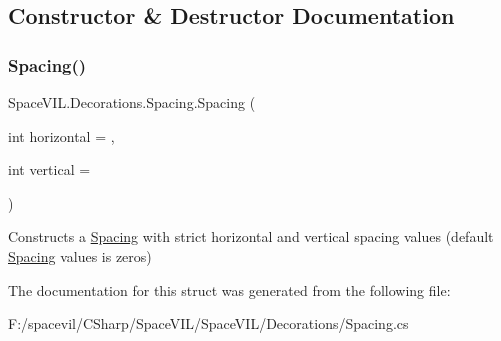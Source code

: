 \subsection{Constructor \& Destructor Documentation}
\mbox{\label{struct_space_v_i_l_1_1_decorations_1_1_spacing_aef752609b39f6b9c34545edff478fbb6}} 
\subsubsection{\texorpdfstring{Spacing()}{Spacing()}}
{\footnotesize\ttfamily Space\+V\+I\+L.\+Decorations.\+Spacing.\+Spacing (\begin{DoxyParamCaption}\item[{int}]{horizontal = {},  }\item[{int}]{vertical = {} }\end{DoxyParamCaption})\hspace{0.3cm}{\ttfamily [inline]}}



Constructs a \mbox{\hyperlink{struct_space_v_i_l_1_1_decorations_1_1_spacing}{Spacing}} with strict horizontal and vertical spacing values (default \mbox{\hyperlink{struct_space_v_i_l_1_1_decorations_1_1_spacing}{Spacing}} values is zeros) 



The documentation for this struct was generated from the following file\+:\begin{DoxyCompactItemize}
\item 
F\+:/spacevil/\+C\+Sharp/\+Space\+V\+I\+L/\+Space\+V\+I\+L/\+Decorations/Spacing.\+cs\end{DoxyCompactItemize}
